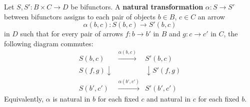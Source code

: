 Let $S, S': B \times C \to D$ be bifunctors. A \textbf{natural transformation} $\alpha: S \to S'$ between bifunctors assigns to each pair of objects $b \in B$, $c \in C$ an arrow
$$\alpha(b, c): S(b, c) \to S'(b, c)$$
in $D$ such that for every pair of arrows $f: b \to b'$ in $B$ and $g: c \to c'$ in $C$, the following diagram commutes:
$$\begin{array}{ccc}
S(b, c) & \xrightarrow{\alpha(b, c)} & S'(b, c) \\
{\scriptstyle S(f, g)}\downarrow & & \downarrow{\scriptstyle S'(f, g)} \\
S(b', c') & \xrightarrow{\alpha(b', c')} & S'(b', c')
\end{array}$$
Equivalently, $\alpha$ is natural in $b$ for each fixed $c$ and natural in $c$ for each fixed $b$.
